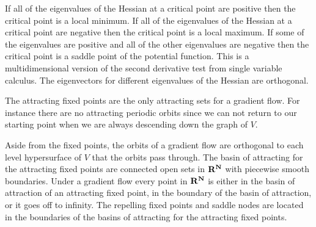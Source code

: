    If all of the eigenvalues of the Hessian at a critical point are positive 
then the critical point is a local minimum.  If all of the eigenvalues of the 
Hessian at a critical point are negative then the critical point is a local 
maximum.  If some of the eigenvalues are positive and all of the other 
eigenvalues are negative then the critical point is a saddle point of the 
potential function.  This is a multidimensional version of the second 
derivative test from single variable calculus.  The eigenvectors for different 
eigenvalues of the Hessian are orthogonal.

   The attracting fixed points are the only attracting sets for a gradient 
flow.  For instance there are no attracting periodic orbits since we can not 
return to our starting point when we are always descending down the graph of 
$V$.  

   Aside from the fixed points, the orbits of a gradient flow are orthogonal to
each level hypersurface of $V$ that the orbits pass through.  The basin of 
attracting for the attracting fixed points are connected open sets in $\bf{R}^N$ 
with piecewise smooth boundaries.  Under a gradient flow every point in 
$\bf{R}^N$ is either in the basin of attraction of an attracting fixed point, in
the boundary of the basin of attraction, or it goes off to infinity.  The 
repelling fixed points and saddle nodes are located in the boundaries of the 
basins of attracting for the attracting fixed points.  

